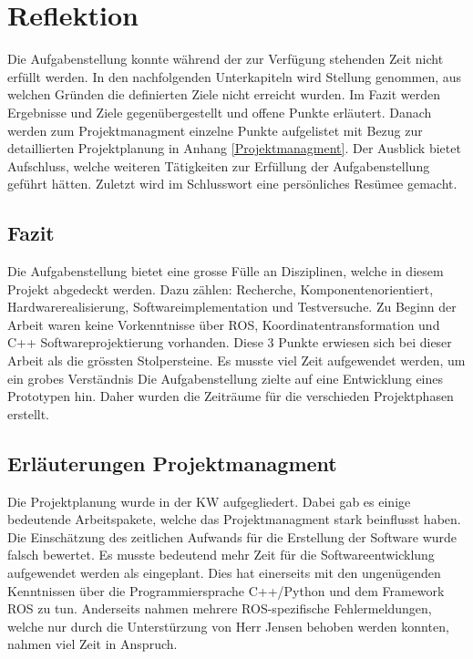 \chapter{Reflektion}
\label{chap:Reflektion}

Die Aufgabenstellung konnte während der zur Verfügung stehenden Zeit nicht erfüllt werden. In den nachfolgenden Unterkapiteln wird Stellung genommen, aus welchen Gründen die definierten Ziele nicht erreicht wurden. Im Fazit werden Ergebnisse und Ziele gegenübergestellt und offene Punkte erläutert. Danach werden zum Projektmanagment einzelne Punkte aufgelistet mit Bezug zur detaillierten Projektplanung in Anhang \ref{Projektmanagment}. Der Ausblick bietet Aufschluss, welche weiteren Tätigkeiten zur Erfüllung der Aufgabenstellung geführt hätten. Zuletzt wird im Schlusswort eine persönliches Resümee gemacht.

\section{Fazit}
\label{sec:Ref_Fazit}
Die Aufgabenstellung bietet eine grosse Fülle an Disziplinen, welche in diesem Projekt abgedeckt werden. Dazu zählen: Recherche, Komponentenorientiert, Hardwarerealisierung, Softwareimplementation und Testversuche. 
Zu Beginn der Arbeit waren keine Vorkenntnisse über ROS, Koordinatentransformation und C++ Softwareprojektierung vorhanden. Diese 3 Punkte erwiesen sich bei dieser Arbeit als die grössten Stolpersteine. Es musste viel Zeit aufgewendet werden, um ein grobes Verständnis  
Die Aufgabenstellung zielte auf eine Entwicklung eines Prototypen hin. Daher wurden die Zeiträume für die verschieden Projektphasen erstellt. 

\section{Erläuterungen Projektmanagment}
\label{sec: pm}

Die Projektplanung wurde in der KW  aufgegliedert. Dabei gab es einige bedeutende Arbeitspakete, welche das Projektmanagment stark beinflusst haben. Die Einschätzung des zeitlichen Aufwands für die Erstellung der Software wurde falsch bewertet. Es musste bedeutend mehr Zeit für die Softwareentwicklung aufgewendet werden als eingeplant. Dies hat einerseits mit den ungenügenden Kenntnissen über die Programmiersprache C++/Python und dem Framework ROS zu tun. Anderseits nahmen  mehrere ROS-spezifische Fehlermeldungen, welche nur durch die Unterstürzung von Herr Jensen behoben werden konnten, nahmen viel Zeit in Anspruch.


